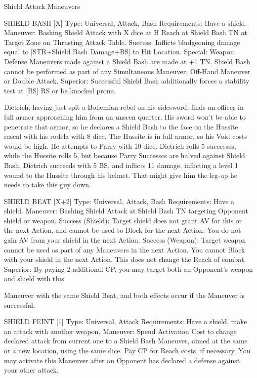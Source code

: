 \documentclass[oneside,11pt,english]{book}
\begin{document}
 

Shield Attack Maneuvers 

 

SHIELD BASH [X] 
Type: Universal, Attack, Bash 
Requirements: Have a shield. 
Maneuver: Bashing Shield Attack with X dice at H Reach at Shield Bash TN at Target Zone on 
Thrusting Attack Table. 
Success: Inflicts bludgeoning damage equal to [STR+Shield Bash Damage+BS] to Hit Location. 
Special: Weapon Defense Maneuvers made against a Shield Bash are made at +1 TN. Shield Bash cannot 
be performed as part of any Simultaneous Maneuver, Off-Hand Maneuver or Double Attack. 
Superior: Successful Shield Bash additionally forces a stability test at [BS] RS or be knocked prone. 

 
Dietrich, having just spit a Bohemian rebel on his sidesword, finds an officer in full armor approaching him from an unseen 
quarter. His sword won’t be able to penetrate that armor, so he declares a Shield Bash to the face on the Hussite rascal with his 
rodela with 8 dice. The Hussite is in full armor, so his Void costs would be high. He attempts to Parry with 10 dice. Dietrich 
rolls 5 successes, while the Hussite rolls 5, but because Parry Successes are halved against Shield Bash, Dietrich succeeds with 5 
BS, and inflicts 11 damage, inflicting a level 1 wound to the Hussite through his helmet. That might give him the leg-up he needs 
to take this guy down. 
 
SHIELD BEAT [X+2] 
Type: Universal, Attack, Bash 
Requirements: Have a shield. 
Maneuver: Bashing Shield Attack at Shield Bash TN targeting Opponent shield or weapon. 
Success (Shield): Target shield does not grant AV for this or the next Action, and cannot be used to Block 
for the next Action. You do not gain AV from your shield in the next Action. 
Success (Weapon): Target weapon cannot be used as part of any Maneuvers in the next Action. You 
cannot Block with your shield in the next Action. This does not change the Reach of combat. 
Superior: By paying 2 additional CP, you may target both an Opponent’s weapon and shield with this 


Maneuver with the same Shield Beat, and both effects occur if the Maneuver is successful. 

 

SHIELD FEINT [1] 
Type: Universal, Attack 
Requirements: Have a shield, make an attack with another weapon. 
Maneuver: Spend Activation Cost to change declared attack from current one to a Shield Bash 
Maneuver, aimed at the same or a new location, using the same dice. Pay CP for Reach costs, if 
necessary. You may activate this Maneuver after an Opponent has declared a defense against your other 
attack. 
\end{document}
